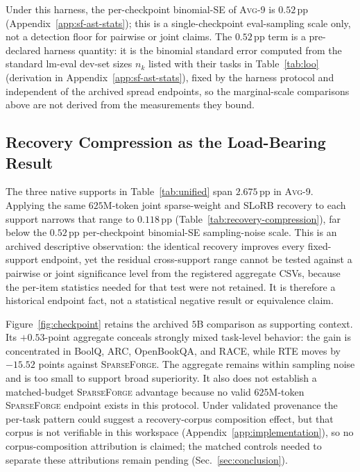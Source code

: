 \documentclass{article}
\newcommand{\method}{\textsc{SparseForge}}
\newcommand{\taskavg}{\textsc{Avg}-9}
\begin{document}

Under this harness, the per-checkpoint binomial-SE of \taskavg{} is $0.52$\,pp (Appendix~\ref{app:sf-ast-stats}); this is a single-checkpoint eval-sampling scale only, not a detection floor for pairwise or joint claims. The $0.52$\,pp term is a pre-declared harness quantity: it is the binomial standard error computed from the standard lm-eval dev-set sizes $n_k$ listed with their tasks in Table~\ref{tab:loo} (derivation in Appendix~\ref{app:sf-ast-stats}), fixed by the harness protocol and independent of the archived spread endpoints, so the marginal-scale comparisons above are not derived from the measurements they bound.

\subsection{Recovery Compression as the Load-Bearing Result}
The three native supports in Table~\ref{tab:unified} span $2.675$\,pp in \taskavg{}. Applying the same $625$M-token joint sparse-weight and SLoRB recovery to each support narrows that range to $0.118$\,pp (Table~\ref{tab:recovery-compression}), far below the $0.52$\,pp per-checkpoint binomial-SE sampling-noise scale. This is an archived descriptive observation: the identical recovery improves every fixed-support endpoint, yet the residual cross-support range cannot be tested against a pairwise or joint significance level from the registered aggregate CSVs, because the per-item statistics needed for that test were not retained. It is therefore a historical endpoint fact, not a statistical negative result or equivalence claim.

Figure~\ref{fig:checkpoint} retains the archived $5$B comparison as supporting context. Its $+0.53$-point aggregate conceals strongly mixed task-level behavior: the gain is concentrated in BoolQ, ARC, OpenBookQA, and RACE, while RTE moves by $-15.52$ points against \method{}. The aggregate remains within sampling noise and is too small to support broad superiority. It also does not establish a matched-budget \method{} advantage because no valid $625$M-token \method{} endpoint exists in this protocol. Under validated provenance the per-task pattern could suggest a recovery-corpus composition effect, but that corpus is not verifiable in this workspace (Appendix~\ref{app:implementation}), so no corpus-composition attribution is claimed; the matched controls needed to separate these attributions remain pending (Sec.~\ref{sec:conclusion}).
\end{document}

